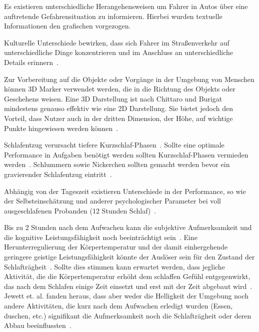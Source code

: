 \documentclass[a4paper, 11pt]{article}
\begin{document}
Es existieren unterschiedliche Herangehensweisen um Fahrer in Autos über eine auftretende Gefahrensituation zu informieren. Hierbei wurden textuelle Informationen den grafischen vorgezogen.~\cite{green1995hazard}

Kulturelle Unterschiede bewirken, dass sich Fahrer im Straßenverkehr auf unterschiedliche Dinge konzentrieren und im Anschluss an unterschiedliche Details erinnern~\cite{yumiko2017VisAttention}.

Zur Vorbereitung auf die Objekte oder Vorgänge in der Umgebung von Menschen können 3D Marker verwendet werden, die in die Richtung des Objekts oder Geschehens weisen. Eine 3D Darstellung ist nach Chittaro und Burigat mindestens genauso effektiv wie eine 2D Darstellung. Sie bietet jedoch den Vorteil, dass Nutzer auch in der dritten Dimension, der Höhe, auf wichtige Punkte hingewiesen werden können~\cite{chittaro20043d}.

Schlafentzug verursacht tiefere Kurzschlaf-Phasen~\cite{dinges1985assessing}. Sollte eine optimale Performance in Aufgaben benötigt werden sollten Kurzschlaf-Phasen vermieden werden~\cite{dinges1985assessing}. Schlummern sowie Nickerchen sollten gemacht werden bevor ein gravierender Schlafentzug eintritt~\cite{dinges1985assessing}.

Abhängig von der Tageszeit existieren Unterschiede in der Performance, so wie der Selbsteinschätzung und anderer psychologischer Parameter bei voll ausgeschlafenen Probanden (12 Stunden Schlaf)~\cite{kraemer2000time}.

Bis zu 2 Stunden nach dem Aufwachen kann die subjektive Aufmerksamkeit und die kognitive Leistungsfähigkeit noch beeinträchtigt sein~\cite{jewett1999time}. Eine Herunterregulierung der Körpertemperatur und der damit einhergehende geringere geistige Leistungsfähigkeit könnte der Auslöser sein für den Zustand der Schlafträgheit~\cite{dinges1990you}. Sollte dies stimmen kann erwartet werden, dass jegliche Aktivität, die die Körpertemperatur erhöht dem schlaffen Gefühl entgegenwirkt, das nach dem Schlafen einige Zeit einsetzt und erst mit der Zeit abgebaut wird~\cite{jewett1999time}. Jewett et. al. fanden heraus, dass aber weder die Helligkeit der Umgebung noch andere Aktivitäten, die kurz nach dem Aufwachen erledigt wurden (Essen, duschen, etc.) signifikant die Aufmerksamkeit noch die Schlafträgheit oder deren Abbau beeinflussten~\cite{jewett1999time}.
\end{document}

